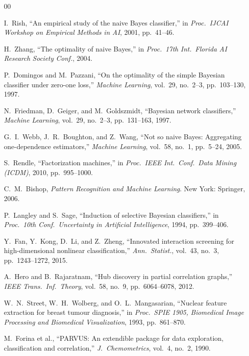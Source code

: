 \documentclass[conference]{IEEEtran}
\begin{document}
\begin{thebibliography}{00}

I.~Rish,
``An empirical study of the naive Bayes classifier,''
in \textit{Proc.\ IJCAI Workshop on Empirical Methods in AI},
2001, pp.~41--46.

H.~Zhang,
``The optimality of naive Bayes,''
in \textit{Proc.\ 17th Int.\ Florida AI Research Society Conf.},
2004.

P.~Domingos and M.~Pazzani,
``On the optimality of the simple Bayesian classifier under zero-one loss,''
\textit{Machine Learning}, vol.~29, no.~2--3, pp.~103--130, 1997.

N.~Friedman, D.~Geiger, and M.~Goldszmidt,
``Bayesian network classifiers,''
\textit{Machine Learning}, vol.~29, no.~2--3, pp.~131--163, 1997.

G.~I.~Webb, J.~R.~Boughton, and Z.~Wang,
``Not so naive Bayes: Aggregating one-dependence estimators,''
\textit{Machine Learning}, vol.~58, no.~1, pp.~5--24, 2005.

S.~Rendle,
``Factorization machines,''
in \textit{Proc.\ IEEE Int.\ Conf.\ Data Mining (ICDM)},
2010, pp.~995--1000.

C.~M.~Bishop,
\textit{Pattern Recognition and Machine Learning}.
New York: Springer, 2006.

P.~Langley and S.~Sage,
``Induction of selective Bayesian classifiers,''
in \textit{Proc.\ 10th Conf.\ Uncertainty in Artificial Intelligence},
1994, pp.~399--406.

Y.~Fan, Y.~Kong, D.~Li, and Z.~Zheng,
``Innovated interaction screening for high-dimensional
nonlinear classification,''
\textit{Ann.\ Statist.}, vol.~43, no.~3,
pp.~1243--1272, 2015.

A.~Hero and B.~Rajaratnam,
``Hub discovery in partial correlation graphs,''
\textit{IEEE Trans.\ Inf.\ Theory}, vol.~58, no.~9,
pp.~6064--6078, 2012.

W.~N.~Street, W.~H.~Wolberg, and O.~L.~Mangasarian,
``Nuclear feature extraction for breast tumour diagnosis,''
in \textit{Proc.\ SPIE 1905, Biomedical Image Processing
and Biomedical Visualization}, 1993, pp.~861--870.

M.~Forina et al.,
``PARVUS: An extendible package for data exploration, classification
and correlation,''
\textit{J.\ Chemometrics}, vol.~4, no.~2, 1990.


\end{thebibliography}
\end{document}
